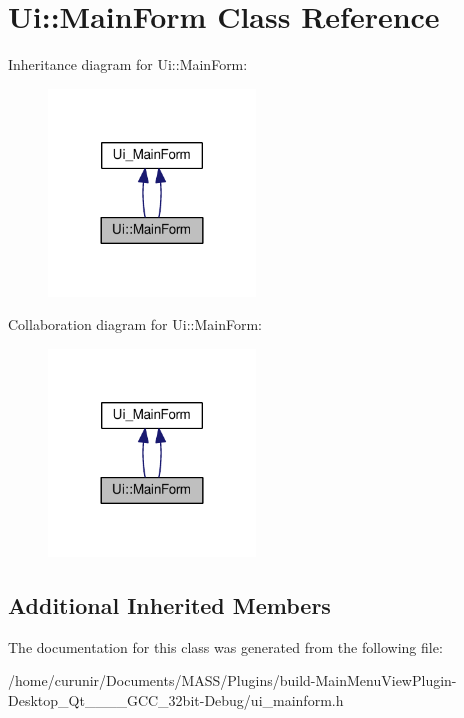 \hypertarget{class_ui_1_1_main_form}{}\section{Ui\+:\+:Main\+Form Class Reference}
\label{class_ui_1_1_main_form}


Inheritance diagram for Ui\+:\+:Main\+Form\+:\nopagebreak
\begin{figure}[H]
\begin{center}
\leavevmode
\includegraphics[width=156pt]{class_ui_1_1_main_form__inherit__graph}
\end{center}
\end{figure}


Collaboration diagram for Ui\+:\+:Main\+Form\+:\nopagebreak
\begin{figure}[H]
\begin{center}
\leavevmode
\includegraphics[width=156pt]{class_ui_1_1_main_form__coll__graph}
\end{center}
\end{figure}
\subsection*{Additional Inherited Members}


The documentation for this class was generated from the following file\+:\begin{DoxyCompactItemize}
\item 
/home/curunir/\+Documents/\+M\+A\+S\+S/\+Plugins/build-\/\+Main\+Menu\+View\+Plugin-\/\+Desktop\+\_\+\+Qt\+\_\+\_\+\_\+\_\+\+G\+C\+C\+\_\+32bit-\/\+Debug/ui\+\_\+mainform.\+h\end{DoxyCompactItemize}
